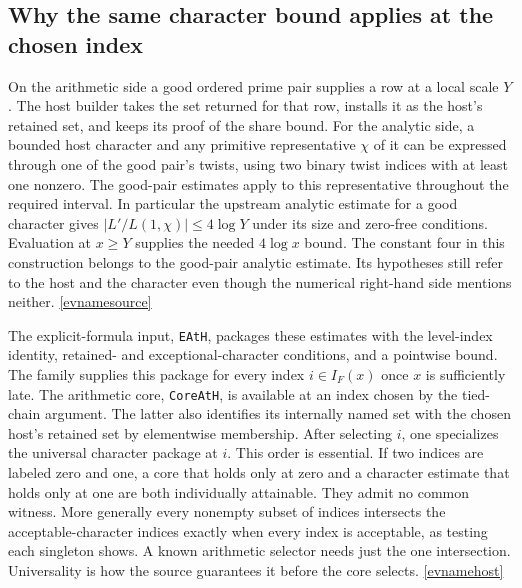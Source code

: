 \documentclass[11pt,letterpaper]{article}
\newcommand{\evref}[1]{\hyperlink{ev-#1}{\textsf{\small[\csname evname#1\endcsname]}}}
\begin{document}
\subsection{Why the same character bound applies at the chosen index}

On the arithmetic side a good ordered prime pair supplies a row at a local scale \(Y\). The host builder takes the set returned for that row, installs it as the host's retained set, and keeps its proof of the share bound. For the analytic side, a bounded host character and any primitive representative \(\chi\) of it can be expressed through one of the good pair's twists, using two binary twist indices with at least one nonzero. The good-pair estimates apply to this representative throughout the required interval. In particular the upstream analytic estimate for a good character gives \(\lvert L'/L(1,\chi)\rvert\leq4\log Y\) under its size and zero-free conditions. Evaluation at \(x\ge Y\) supplies the needed \(4\log x\) bound. The constant four in this construction belongs to the good-pair analytic estimate. Its hypotheses still refer to the host and the character even though the numerical right-hand side mentions neither. \evref{source}

The explicit-formula input, \texttt{EAtH}, packages these estimates with the level-index identity, retained- and exceptional-character conditions, and a pointwise bound. The family supplies this package for every index \(i\in I_F(x)\) once \(x\) is sufficiently late. The arithmetic core, \texttt{CoreAtH}, is available at an index chosen by the tied-chain argument. The latter also identifies its internally named set with the chosen host's retained set by elementwise membership. After selecting \(i\), one specializes the universal character package at \(i\). This order is essential. If two indices are labeled zero and one, a core that holds only at zero and a character estimate that holds only at one are both individually attainable. They admit no common witness. More generally every nonempty subset of indices intersects the acceptable-character indices exactly when every index is acceptable, as testing each singleton shows. A known arithmetic selector needs just the one intersection. Universality is how the source guarantees it before the core selects. \evref{host}
\end{document}
